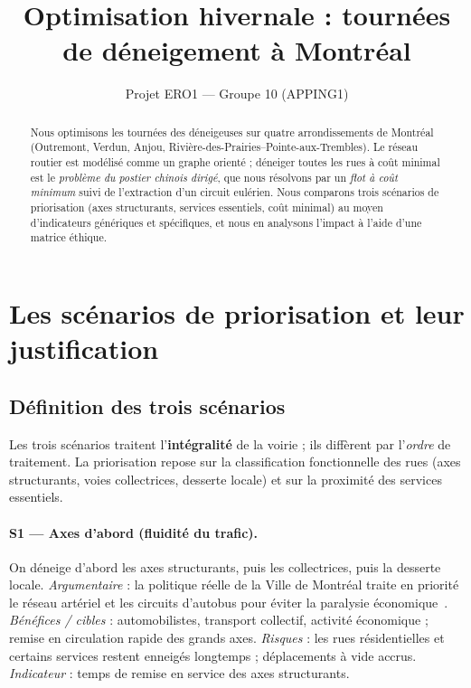 \documentclass[11pt,a4paper]{article}
\title{\vspace{-1.2cm}\textbf{Optimisation hivernale : tournées de déneigement à Montréal}}
\author{Projet ERO1 — Groupe 10 (APPING1)}
\date{\vspace{-0.4cm}}
\begin{document}
\maketitle
\vspace{-0.6cm}

\begin{abstract}\small
\noindent Nous optimisons les tournées des déneigeuses sur quatre arrondissements de
Montréal (Outremont, Verdun, Anjou, Rivière-des-Prairies–Pointe-aux-Trembles).
Le réseau routier est modélisé comme un graphe orienté ; déneiger toutes les
rues à coût minimal est le \emph{problème du postier chinois dirigé}, que nous
résolvons par un \emph{flot à coût minimum} suivi de l'extraction d'un circuit
eulérien. Nous comparons trois scénarios de priorisation (axes structurants,
services essentiels, coût minimal) au moyen d'indicateurs génériques et
spécifiques, et nous en analysons l'impact à l'aide d'une matrice éthique.
\end{abstract}

\section{Les scénarios de priorisation et leur justification}

\subsection{Définition des trois scénarios}
Les trois scénarios traitent l'\textbf{intégralité} de la voirie ; ils diffèrent
par l'\emph{ordre} de traitement. La priorisation repose sur la classification
fonctionnelle des rues (axes structurants, voies collectrices, desserte locale)
et sur la proximité des services essentiels.

\paragraph{S1 — Axes d'abord (fluidité du trafic).} On déneige d'abord les axes
structurants, puis les collectrices, puis la desserte locale. \emph{Argumentaire}
: la politique réelle de la Ville de Montréal traite en priorité le réseau
artériel et les circuits d'autobus pour éviter la paralysie économique~\cite{vdm,new18}.
\emph{Bénéfices / cibles} : automobilistes, transport collectif, activité
économique ; remise en circulation rapide des grands axes. \emph{Risques} :
les rues résidentielles et certains services restent enneigés longtemps ;
déplacements à vide accrus. \emph{Indicateur} : temps de remise en service des
axes structurants.
\end{document}
